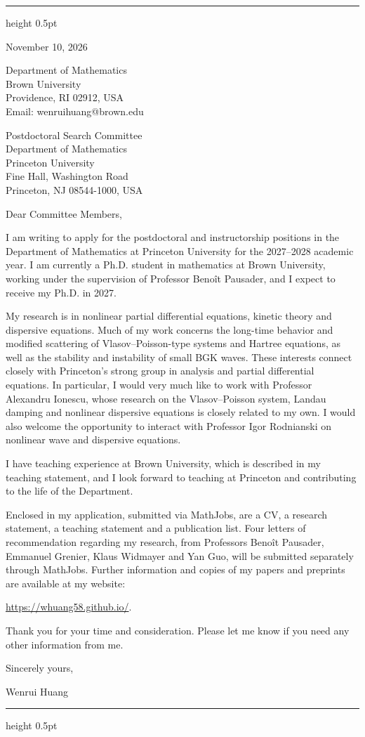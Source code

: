 \documentclass[10pt]{article}
\begin{document}
\vspace{0.08in}
\hrule height 0.5pt

\vspace{0.47in}
\hfill
\begin{minipage}{2.27in}
November 10, 2026

\vspace{0.16in}
Department of Mathematics\\
Brown University\\
Providence, RI 02912, USA\\
Email: wenrui\textunderscore huang@brown.edu
\end{minipage}

\vspace{0.30in}
Postdoctoral Search Committee\\
Department of Mathematics\\
Princeton University\\
Fine Hall, Washington Road\\
Princeton, NJ 08544-1000, USA

\vspace{0.16in}
Dear Committee Members,

I am writing to apply for the postdoctoral and instructorship positions in the Department of Mathematics at Princeton University for the 2027--2028 academic year. I am currently a Ph.D. student in mathematics at Brown University, working under the supervision of Professor Beno\^{i}t Pausader, and I expect to receive my Ph.D. in 2027.

My research is in nonlinear partial differential equations, kinetic theory and dispersive equations. Much of my work concerns the long-time behavior and modified scattering of Vlasov--Poisson-type systems and Hartree equations, as well as the stability and instability of small BGK waves. These interests connect closely with Princeton's strong group in analysis and partial differential equations. In particular, I would very much like to work with Professor Alexandru Ionescu, whose research on the Vlasov--Poisson system, Landau damping and nonlinear dispersive equations is closely related to my own. I would also welcome the opportunity to interact with Professor Igor Rodnianski on nonlinear wave and dispersive equations.

I have teaching experience at Brown University, which is described in my teaching statement, and I look forward to teaching at Princeton and contributing to the life of the Department.

Enclosed in my application, submitted via MathJobs, are a CV, a research statement, a teaching statement and a publication list. Four letters of recommendation regarding my research, from Professors Beno\^{i}t Pausader, Emmanuel Grenier, Klaus Widmayer and Yan Guo, will be submitted separately through MathJobs. Further information and copies of my papers and preprints are available at my website:

\url{https://whuang58.github.io/}.

\medskip
Thank you for your time and consideration. Please let me know if you need any other information from me.

\vspace{0.12in}
Sincerely yours,

\vspace{0.12in}
Wenrui Huang

\vfill
\hrule height 0.5pt
\end{document}
